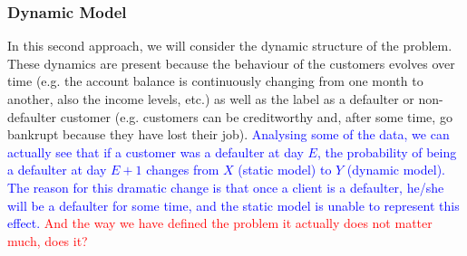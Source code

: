 \subsubsection*{Dynamic Model} 

In this second approach, we will consider the dynamic structure of the problem. These dynamics are present because the behaviour of the customers evolves over time (e.g. the account balance is continuously changing from one month to another, also the income levels, etc.)  as well as the label as a defaulter or non-defaulter customer (e.g. customers can be creditworthy and, after some time, go bankrupt because they have lost their job). \textcolor{blue}{Analysing some of the data, we can actually see that if a customer was a defaulter at day $E$, the probability of being a defaulter at day $E+1$ changes from $X$ (static model) to $Y$ (dynamic model). The reason for this dramatic change is that once a client is a defaulter, he/she will be a defaulter for some time, and the static model is unable to represent this effect.} \textcolor{red}{ And the way we have defined the problem it actually does not matter much, does it?} 




%  
%  
%  
%  
%  

